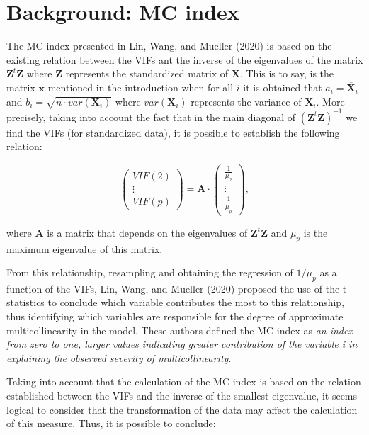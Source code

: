 \hypertarget{background-mc-index}{%
\section{Background: MC index}\label{background-mc-index}}

The MC index presented in Lin, Wang, and Mueller (2020) is based on the existing relation between the VIFs ant the inverse of the eigenvalues of the matrix \(\mathbf{Z}^{t} \mathbf{Z}\) where \(\mathbf{Z}\) represents the standardized matrix of \(\mathbf{X}\). This is to say, is the matrix \(\mathbf{x}\) mentioned in the introduction when for all \(i\) it is obtained that \(a_{i} = \overline{\mathbf{X}}_{i}\) and \(b_{i} = \sqrt{n \cdot var \left( \mathbf{X}_{i} \right)}\) where \(var \left( \mathbf{X}_{i} \right)\) represents the variance of \(\mathbf{X}_{i}\).
More precisely, taking into account the fact that in the main diagonal of \(\left( \mathbf{Z}^{t} \mathbf{Z} \right)^{-1}\) we find the VIFs (for standardized data), it is possible to establish the following relation:

\begin{equation}
\left(
\begin{array}{c}
VIF(2) \\
\vdots \\
VIF(p)
\end{array}
\right) = \mathbf{A} \cdot \left(
\begin{array}{c}
\frac{1}{\mu_{2}} \\
\vdots \\
\frac{1}{\mu_{p}}
\end{array}
\right),
\end{equation}

where \(\mathbf{A}\) is a matrix that depends on the eigenvalues of \(\mathbf{Z}^{t} \mathbf{Z}\) and \(\mu_{p}\) is the maximum eigenvalue of this matrix.

From this relationship, resampling and obtaining the regression of \(1/\mu_{p}\) as a function of the VIFs, Lin, Wang, and Mueller (2020) proposed the use of the t-statistics to conclude which variable contributes the most to this relationship, thus identifying which variables are responsible for the degree of approximate multicollinearity in the model. These authors defined the MC index as \emph{an index from zero to one, larger values indicating greater contribution of the variable i in explaining the observed severity of multicollinearity}.

Taking into account that the calculation of the MC index is based on the relation established between the VIFs and the inverse of the smallest eigenvalue, it seems logical to consider that the transformation of the data may affect the calculation of this measure. Thus, it is possible to conclude:

